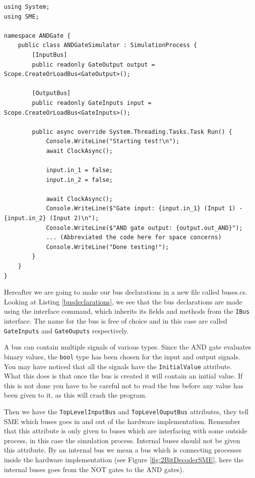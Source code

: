 \begin{lstlisting}[language={[Sharp]C}, caption={The simulator file, which specifies how the simulation is run. Most lines in the run method are concatenated brievity.},captionpos=b, label = simulatorfile]
using System;
using SME;

namespace ANDGate {
    public class ANDGateSimulator : SimulationProcess {
        [InputBus]
        public readonly GateOutput output = Scope.CreateOrLoadBus<GateOutput>();
        
        [OutputBus]
        public readonly GateInputs input = Scope.CreateOrLoadBus<GateInputs>();
        
        public async override System.Threading.Tasks.Task Run() {
            Console.WriteLine("Starting test!\n");
            await ClockAsync();
            
            input.in_1 = false;
            input.in_2 = false;
            
            await ClockAsync();
            Console.WriteLine($"Gate input: {input.in_1} (Input 1) - {input.in_2} (Input 2)\n");
            Console.WriteLine($"AND gate output: {output.out_AND}");
            ... (Abbreviated the code here for space concerns)
            Console.WriteLine("Done testing!");
        }
    }
}
\end{lstlisting}
\newpage
        Hereafter we are going to make our bus declarations in a new file called buses.cs. Looking at Listing \ref{busdeclarations}, we see that the bus declarations are made using the interface command, which inherits its fields and methods from the \texttt{IBus} interface. The name for the bus is free of choice and in this case are called \texttt{GateInputs} and \texttt{GateOuputs} respectively.
        
        A bus can contain multiple signals of various types. Since the AND gate evaluates binary values, the \texttt{bool} type has been chosen for the input and output signals. You may have noticed that all the signals have the \texttt{InitialValue} attribute. What this does is that once the bus is created it will contain an initial value. If this is not done you have to be careful not to read the bus before any value has been given to it, as this will crash the program.
        
        Then we have the \texttt{TopLevelInputBus} and \texttt{TopLevelOuputBus} attributes, they tell SME which buses goes in and out of the hardware implementation. Remember that this attribute is only given to buses which are interfacing with some outside process, in this case the simulation process. Internal buses should not be given this attribute. By an internal bus we mean a bus which is connecting processes inside the hardware implementation (see Figure \ref{fig:2BitDecoderSME}, here the internal buses goes from the NOT gates to the AND gates).

